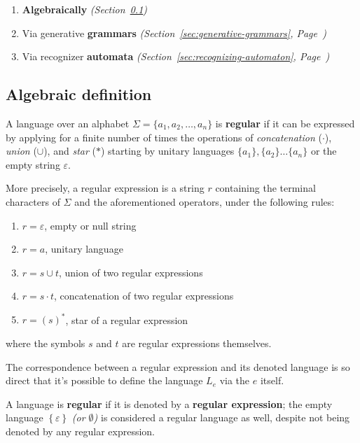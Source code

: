 \documentclass[english]{article}
\begin{document}
\begin{enumerate}
  \item \textbf{Algebraically} \textit{(Section~\ref{sec:reglang-algebraic})}
  \item Via generative \textbf{grammars} \textit{(Section~\ref{sec:generative-grammars}, Page~\pageref{sec:generative-grammars})}
  \item Via recognizer \textbf{automata} \textit{(Section~\ref{sec:recognizing-automaton}, Page~\pageref{sec:recognizing-automaton})}
\end{enumerate}

\subsection{Algebraic definition}
\label{sec:reglang-algebraic}

A language over an alphabet \(\Sigma = \{a_1, a_2, \ldots, a_n\}\) is \textbf{regular} if it can be expressed by applying for a finite number of times the operations of \textit{concatenation} (\(\cdot\)), \textit{union} (\(\cup\)), and \textit{star} (\(\ast\)) starting by unitary languages \(\{a_1\}, \{a_2\} \ldots \{a_n\}\) or the empty string \(\varepsilon\).

More precisely, a regular expression is a string \(r\) containing the terminal characters of \(\Sigma\) and the aforementioned operators, under the following rules:

\begin{enumerate}
  \item \(r = \varepsilon\), empty or null string
  \item \(r = a\), unitary language
  \item \(r = s \cup t\), union of two regular expressions
  \item \(r = s \cdot t\), concatenation of two regular expressions
  \item \(r = (s)^\ast\), star of a regular expression
\end{enumerate}

where the symbols \(s\) and \(t\) are regular expressions themselves.

\bigskip
The correspondence between a regular expression and its denoted language is so direct that it's possible to define the language \(L_e\) via the \re \(e\) itself.

A language is \textbf{regular} if it is denoted by a \textbf{regular expression};
the empty language \(\left\{ \varepsilon \right\}\) \textit{(or \(\emptyset\))} is considered a regular language as well, despite not being denoted by any regular expression.
\end{document}
